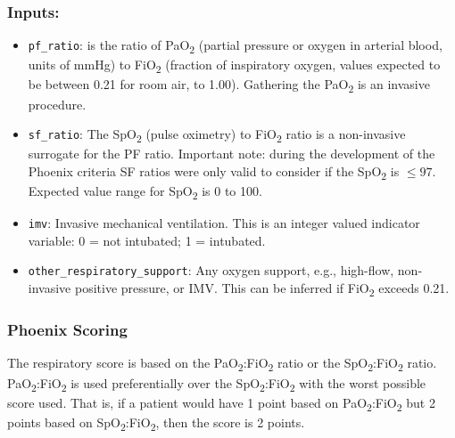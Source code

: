 \documentclass[
  letterpaper,
  DIV=11,
  numbers=noendperiod]{scrartcl}
\begin{document}
\subsubsection{Inputs:}\label{inputs}

\begin{itemize}
\item
  \texttt{pf\_ratio}: is the ratio of PaO\textsubscript{2} (partial
  pressure or oxygen in arterial blood, units of mmHg) to
  FiO\textsubscript{2} (fraction of inspiratory oxygen, values expected
  to be between 0.21 for room air, to 1.00). Gathering the
  PaO\textsubscript{2} is an invasive procedure.
\item
  \texttt{sf\_ratio}: The SpO\textsubscript{2} (pulse oximetry) to
  FiO\textsubscript{2} ratio is a non-invasive surrogate for the PF
  ratio. Important note: during the development of the Phoenix criteria
  SF ratios were only valid to consider if the SpO\textsubscript{2} is
  \(\leq 97\). Expected value range for SpO\textsubscript{2} is 0 to
  100.
\item
  \texttt{imv}: Invasive mechanical ventilation. This is an integer
  valued indicator variable: 0 = not intubated; 1 = intubated.
\item
  \texttt{other\_respiratory\_support}: Any oxygen support, e.g.,
  high-flow, non-invasive positive pressure, or IMV. This can be
  inferred if FiO\textsubscript{2} exceeds 0.21.
\end{itemize}

\subsubsection{Phoenix Scoring}\label{phoenix-scoring}

The respiratory score is based on the
PaO\textsubscript{2}:FiO\textsubscript{2} ratio or the
SpO\textsubscript{2}:FiO\textsubscript{2} ratio.
PaO\textsubscript{2}:FiO\textsubscript{2} is used preferentially over
the SpO\textsubscript{2}:FiO\textsubscript{2} with the worst possible
score used. That is, if a patient would have 1 point based on
PaO\textsubscript{2}:FiO\textsubscript{2} but 2 points based on
SpO\textsubscript{2}:FiO\textsubscript{2}, then the score is 2 points.
\end{document}
